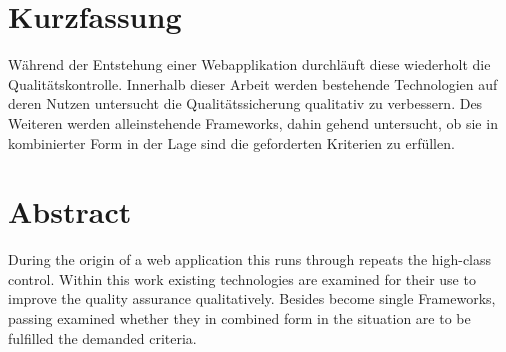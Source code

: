 \section*{Kurzfassung}
Während der Entstehung einer Webapplikation durchläuft diese wiederholt die Qualitätskontrolle. Innerhalb dieser Arbeit werden bestehende Technologien auf deren Nutzen untersucht die Qualitätssicherung qualitativ zu verbessern. Des Weiteren werden alleinstehende Frameworks, dahin gehend untersucht, ob sie in kombinierter Form in der Lage sind die geforderten Kriterien zu erfüllen.


\section*{Abstract}
During the origin of a web application this runs through repeats the high-class control. Within this work existing technologies are examined for their use to improve the quality assurance qualitatively. Besides become single Frameworks, passing examined whether they in combined form in the situation are to be fulfilled the demanded criteria.